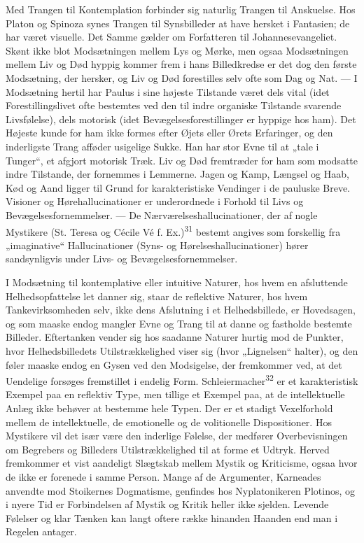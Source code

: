 \documentclass[12pt,a4paper,openany]{book}
\newcommand{\opage}[1]{\marginnote{\footnotesize\textit{[#1]}}}
\begin{document}
Med Trangen til Kontemplation forbinder sig naturlig Trangen til
Anskuelse. Hos Platon og Spinoza synes Trangen til Synsbilleder at have
hersket i Fantasien; de har været visuelle. Det Samme gælder om
Forfatteren til Johannesevangeliet. Skønt ikke blot Modsætningen mellem
Lys og Mørke, men ogsaa Modsætningen mellem Liv og Død hyppig kommer
frem i hans Billedkredse er det dog den første Modsætning, der hersker,
og Liv og Død forestilles selv ofte som Dag og Nat. --- I Modsætning
hertil har Paulus i sine højeste Tilstande været dels vital (idet
Forestillingslivet ofte bestemtes ved den til indre organiske Tilstande
svarende Livsfølelse), dels motorisk (idet Bevægelsesforestillinger er
hyppige hos ham). Det Højeste kunde for ham ikke formes efter Øjets
eller Ørets Erfaringer, og den inderligste Trang afføder usigelige
Sukke. Han har stor Evne til at „tale i Tunger“, et afgjort motorisk
Træk. Liv og Død fremtræder for ham som
\opage{77}modsatte indre Tilstande, der fornemmes i Lemmerne. Jagen og
Kamp, Længsel og Haab, Kød og Aand ligger til Grund for karakteristiske
Vendinger i de pauluske Breve. Visioner og Hørehallucinationer er
underordnede i Forhold til Livs og Bevægelsesfornemmelser. --- De
Nærværelseshallucinationer, der af nogle Mystikere (St. Teresa og Cécile
Vé f. Ex.)\textsuperscript{31} bestemt angives som forskellig fra
„imaginative“ Hallucinationer (Syns- og Hørelseshallucinationer) hører
sandsynligvis under Livs- og Bevægelsesfornemmelser.

I Modsætning til kontemplative eller intuitive Naturer, hos hvem en
afsluttende Helhedsopfattelse let danner sig, staar de reflektive
Naturer, hos hvem Tankevirksomheden selv, ikke dens Afslutning i et
Helhedsbillede, er Hovedsagen, og som maaske endog mangler Evne og Trang
til at danne og fastholde bestemte Billeder. Eftertanken vender sig hos
saadanne Naturer hurtig mod de Punkter, hvor Helhedsbilledets
Utilstrækkelighed viser sig (hvor „Lignelsen“ halter), og den føler
maaske endog en Gysen ved den Modsigelse, der fremkommer ved, at det
Uendelige forsøges fremstillet i endelig Form.
Schleiermacher\textsuperscript{32} er et karakteristisk Exempel paa en
reflektiv Type, men tillige et Exempel paa, at de intellektuelle Anlæg
ikke behøver at bestemme hele Typen. Der er et stadigt Vexelforhold
mellem de intellektuelle, de emotionelle og de volitionelle
Dispositioner. Hos Mystikere vil det især være den inderlige Følelse,
der medfører Overbevisningen om Begrebers og Billeders Utilstrækkelighed
til at forme et Udtryk. Herved fremkommer et vist aandeligt Slægtskab
mellem Mystik og Kriticisme, ogsaa hvor de ikke er forenede i samme
Person. Mange af de Argumenter, Karneades anvendte mod Stoikernes
Dogmatisme, genfindes hos Nyplatonikeren Plotinos, og i nyere Tid er
Forbindelsen af Mystik og Kritik heller ikke sjelden. Levende Følelser
og klar Tænken kan langt oftere række hinanden Haanden end man i Regelen
antager.
\end{document}
